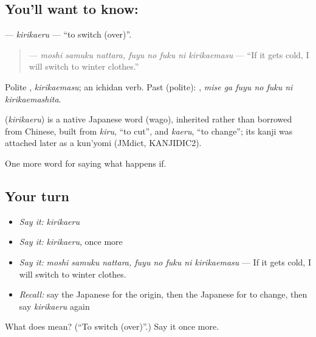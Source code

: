 \subsection*{You'll want to know: }
\textbf{} — \emph{kirikaeru} — \textquotedblleft{}to switch (over)\textquotedblright{}.

\begin{quote}
\textbf{    } — \emph{moshi samuku nattara, fuyu no fuku ni kirikaemasu} — \textquotedblleft{}If it gets cold, I will switch to winter clothes.\textquotedblright{}
\end{quote}

Polite \textbf{}, \emph{kirikaemasu}; an ichidan verb. Past (polite): \textbf{   }, \emph{mise ga fuyu no fuku ni kirikaemashita}.

\begin{cousinweb}
\textbf{} (\emph{kirikaeru}) is a native Japanese word (wago), inherited rather than borrowed from Chinese, built from \emph{kiru}, \textquotedblleft{}to cut\textquotedblright{}, and \emph{kaeru}, \textquotedblleft{}to change\textquotedblright{}; its kanji was attached later as a kun'yomi (JMdict, KANJIDIC2).
\end{cousinweb}

\begin{grammarlens}[title={What you've built}]
One more word for saying what happens if.
\end{grammarlens}

\subsection*{Your turn}
\begin{itemize}
\raggedright
  \item \emph{Say it:} \emph{kirikaeru}
  \item \emph{Say it:} \emph{kirikaeru}, once more
  \item \emph{Say it:} \emph{moshi samuku nattara, fuyu no fuku ni kirikaemasu} — If it gets cold, I will switch to winter clothes.
  \item \emph{Recall:} say the Japanese for the origin, then the Japanese for to change, then say \emph{kirikaeru} again
\end{itemize}

\begin{tcolorbox}[breakable,colback=teal!4,colframe=teal!35!black,title={Before you move on}]
What does  mean? (\textquotedblleft{}To switch (over)\textquotedblright{}.) Say it once more.
\end{tcolorbox}
